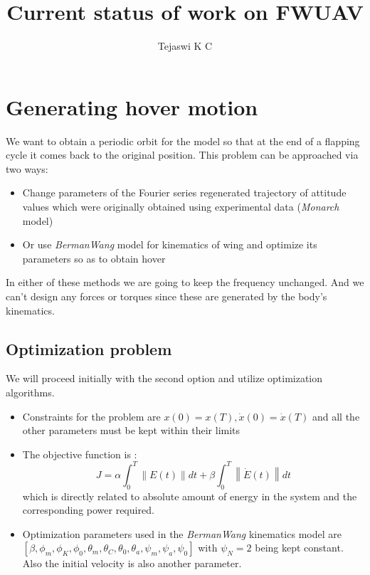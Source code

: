 \documentclass[10pt]{article}
\date{}
\author{Tejaswi K C}
\title{Current status of work on FWUAV}
\newcommand{\norm}[1]{\ensuremath{\left\| #1 \right\|}}
\begin{document}
\maketitle

\section{Generating hover motion}
We want to obtain a periodic orbit for the model so that at the end of a flapping cycle it comes back to the original position. This problem can be approached via two ways:
\begin{itemize}
	\item Change parameters of the Fourier series regenerated trajectory of attitude values which were originally obtained using experimental data (\textit{Monarch} model)
	\item Or use \textit{BermanWang} model for kinematics of wing and optimize its parameters so as to obtain hover
\end{itemize}
In either of these methods we are going to keep the frequency unchanged. And we can't design any forces or torques since these are generated by the body's kinematics.

\subsection{Optimization problem}
We will proceed initially with the second option and utilize optimization algorithms.
\begin{itemize}
	\item Constraints for the problem are $ x(0) = x(T), \dot{x}(0) = \dot{x}(T) $ and all the other parameters must be kept within their limits
	\item The objective function is :
	\[ J = \alpha \int_{0}^{T} \norm{E(t)} dt + \beta \int_{0}^{T} \norm{\dot{E}(t)} dt \]
	which is directly related to absolute amount of energy in the system and the corresponding power required.
	\item Optimization parameters used in the \textit{BermanWang} kinematics model are $ [\beta, \phi_m, \phi_K, \phi_0, \theta_m, \theta_C, \theta_0, \theta_a, \psi_m, \psi_a, \psi_0] $ with $ \psi_N = 2 $ being kept constant. Also the initial velocity is also another parameter.
\end{itemize}

\end{document}
